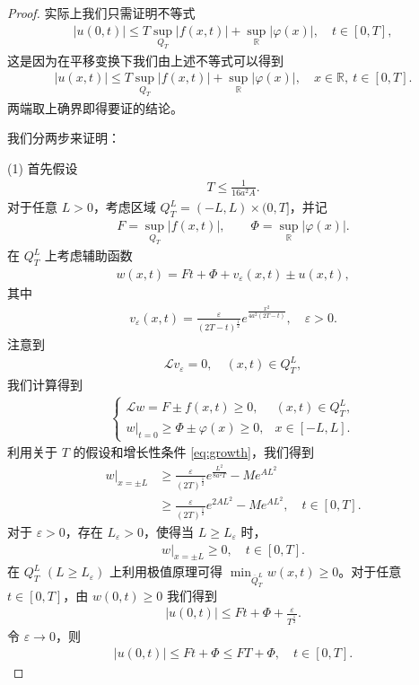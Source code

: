 \documentclass[../../main.tex]{subfiles}%
\begin{document}
\begin{proof}
实际上我们只需证明不等式
\begin{align*}
|u(0,t)|\leqslant T\sup_{Q_T}|f(x,t)|+\sup_{\mathbb{R}}|\varphi(x)|,\quad t\in[0,T],
\end{align*}
这是因为在平移变换下我们由上述不等式可以得到
\begin{align*}
|u(x,t)|\leqslant T\sup_{Q_T}|f(x,t)|+\sup_{\mathbb{R}}|\varphi(x)|,\quad x\in\mathbb{R},\ t\in[0,T].
\end{align*}
两端取上确界即得要证的结论。

我们分两步来证明：

(1) 首先假设
\begin{align*}
T\leqslant \frac{1}{16a^2A}.
\end{align*}
对于任意 $L>0$，考虑区域 $Q_T^L=(-L,L)\times(0,T]$，并记
\begin{align*}
F=\sup_{Q_T}|f(x,t)|,\qquad \Phi=\sup_{\mathbb{R}}|\varphi(x)|.
\end{align*}
在 $Q_T^L$ 上考虑辅助函数
\begin{align*}
w(x,t)=Ft+\Phi+v_\varepsilon(x,t)\pm u(x,t),
\end{align*}
其中
\begin{align*}
v_\varepsilon(x,t)=\frac{\varepsilon}{(2T-t)^{\frac{1}{2}}}e^{\frac{x^2}{4a^2(2T-t)}},\quad \varepsilon>0.
\end{align*}
注意到
\begin{align*}
\mathcal{L}v_\varepsilon=0,\quad (x,t)\in Q_T^L,
\end{align*}
我们计算得到
\begin{align*}
\begin{cases}
\mathcal{L}w=F\pm f(x,t)\geqslant 0, & (x,t)\in Q_T^L,\\
w|_{t=0}\geqslant \Phi\pm\varphi(x)\geqslant 0, & x\in[-L,L].
\end{cases}
\end{align*}
利用关于 $T$ 的假设和增长性条件 \eqref{eq:growth}，我们得到
\begin{align*}
w|_{x=\pm L}&\geqslant \frac{\varepsilon}{(2T)^{\frac{1}{2}}}e^{\frac{L^2}{8a^2T}}-Me^{AL^2} \\
&\geqslant \frac{\varepsilon}{(2T)^{\frac{1}{2}}}e^{2AL^2}-Me^{AL^2},\quad t\in[0,T].
\end{align*}
对于 $\varepsilon>0$，存在 $L_\varepsilon>0$，使得当 $L\geqslant L_\varepsilon$ 时，
\begin{align*}
w|_{x=\pm L}\geqslant 0,\quad t\in[0,T].
\end{align*}
在 $Q_T^L$ $(L\geqslant L_\varepsilon)$ 上利用极值原理可得 $\min_{\overline{Q}_T^L}w(x,t)\geqslant 0$。对于任意 $t\in[0,T]$，由 $w(0,t)\geqslant 0$ 我们得到
\begin{align*}
|u(0,t)|\leqslant Ft+\Phi+\frac{\varepsilon}{T^{\frac{1}{2}}}.
\end{align*}
令 $\varepsilon\to 0$，则
\begin{align*}
|u(0,t)|\leqslant Ft+\Phi\leqslant FT+\Phi,\quad t\in[0,T].
\end{align*}


\end{proof}
\end{document}
